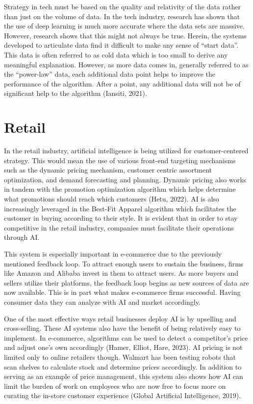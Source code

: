 \documentclass[
]{book}
\begin{document}
Strategy in tech must be based on the quality and relativity of the data rather than just on the volume of data. In the tech industry, research has shown that the use of deep learning is much more accurate where the data sets are massive. However, research shows that this might not always be true. Herein, the systems developed to articulate data find it difficult to make any sense of ``start data''. This data is often referred to as cold data which is too small to derive any meaningful explanation. However, as more data comes in, generally referred to as the ``power-law'' data, each additional data point helps to improve the performance of the algorithm. After a point, any additional data will not be of significant help to the algorithm (Iansiti, 2021).

\hypertarget{retail}{%
\section{Retail}\label{retail}}

In the retail industry, artificial intelligence is being utilized for customer-centered strategy. This would mean the use of various front-end targeting mechanisms such as the dynamic pricing mechanism, customer centric assortment optimization, and demand forecasting and planning. Dynamic pricing also works in tandem with the promotion optimization algorithm which helps determine what promotions should reach which customers (Hetu, 2022). AI is also increasingly leveraged in the Best-Fit Apparel algorithm which facilitates the customer in buying according to their style. It is evident that in order to stay competitive in the retail industry, companies must facilitate their operations through AI.

This system is especially important in e-commerce due to the previously mentioned feedback loop. To attract enough users to sustain the business, firms like Amazon and Alibaba invest in them to attract users. As more buyers and sellers utilize their platforms, the feedback loop begins as new sources of data are now available. This is in part what makes e-commerce firms successful. Having consumer data they can analyze with AI and market accordingly.

One of the most effective ways retail businesses deploy AI is by upselling and cross-selling. These AI systems also have the benefit of being relatively easy to implement. In e-commerce, algorithms can be used to detect a competitor's price and adjust one's own accordingly (Hamer, Elliot, Hare, 2023). AI pricing is not limited only to online retailers though. Walmart has been testing robots that scan shelves to calculate stock and determine prices accordingly. In addition to serving as an example of price management, this system also shows how AI can limit the burden of work on employees who are now free to focus more on curating the in-store customer experience (Global Artificial Intelligence, 2019).
\end{document}
